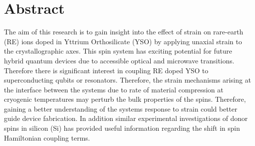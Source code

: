 \chapter{Abstract} The aim of this research is to gain insight into the effect of strain on rare-earth (RE) ions doped in Yttrium Orthosilicate (YSO) by applying unaxial strain to the crystallographic axes. This spin system has exciting potential for future hybrid quantum devices due to accessible optical and microwave transitions. Therefore there is significant interest in coupling RE doped YSO to superconducting qubits or resonators. Therefore, the strain mechanisms arising at the interface between the systems due to rate of material compression at cryogenic temperatures may perturb the bulk properties of the spins. Therefore, gaining a better understanding of the systems response to strain could better guide device fabrication. In addition similar experimental investigations of donor spins in silicon (Si) has provided useful information regarding the shift in spin Hamiltonian coupling terms.     
